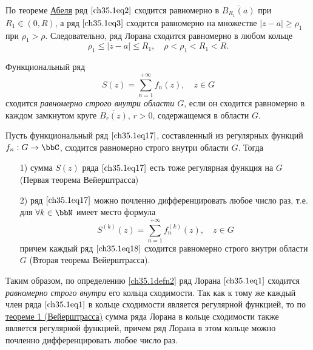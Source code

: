 По теореме \hyperref[ch34.2Thm1]{Абеля} ряд $\eqref{ch35.1eq2}$ сходится равномерно в $\overline{B_{R_1}(a)}$ при 
$R_1 \in (0,R)$, а ряд $\eqref{ch35.1eq3}$ сходится равномерно на множестве $|z - a| \ge \rho_1$ при $\rho_1 > \rho$. Следовательно, ряд Лорана сходится равномерно в любом кольце
$$
\rho_1 \le |z - a| \le R_1, \quad \rho < \rho_1 < R_1 < R.
$$

\begin{defn}\label{ch35.1defn2} 
Функциональный ряд 
\begin{equation} \label{ch35.1eq17}
S(z)=\sum\limits_{n=1}^{+\infty} f_n(z), \quad z\in G
\end{equation}
 сходится \textit{равномерно строго внутри области $G$}, если он сходится равномерно в каждом замкнутом круге $\overline{B_r(z)}$, $r>0$, содержащемся в области $G$.
\end{defn}

\begin{thm} \label{ch35.1Thm5}
Пусть функциональный ряд $\eqref{ch35.1eq17}$, составленный из регулярных функций $f_n: G \to \bbC$, сходится равномерно строго внутри области $G$. Тогда
\begin{enumerate}
	\item[1)] {\rightskip=3.5cm} {сумма $S(z)$ ряда $\eqref{ch35.1eq17}$ есть тоже регулярная функция на $G$ (Первая теорема Вейерштрасса)
	}
	\item[2)] {\rightskip=0cm}{ряд $\eqref{ch35.1eq17}$ можно почленно дифференцировать любое число раз, т.е. для $\forall k \in \bbN$ имеет место формула 
	\begin{equation} \label{ch35.1eq18}
	S^{(k)}(z) = \sum\limits_{n=1}^{+\infty} f_{n}^{(k)}(z), \quad z \in G
	\end{equation}
	причем каждый ряд $\eqref{ch35.1eq18}$ сходится равномерно строго внутри области $G$ (Вторая теорема Вейерштрасса).	}
\end{enumerate}
\end{thm}

Таким образом, по определению \ref{ch35.1defn2} ряд Лорана $\eqref{ch35.1eq1}$ сходится \textit{равномерно строго внутри} его кольца сходимости. Так как к тому же каждый член ряда $\eqref{ch35.1eq1}$ в кольце сходимости является регулярной функцией, то по  \hyperref[ch35.1Thm5]{теореме 1 (Вейерштрасса)} сумма ряда Лорана в кольце сходимости также является регулярной функцией, причем ряд Лорана в этом кольце можно почленно дифференцировать любое число раз.

